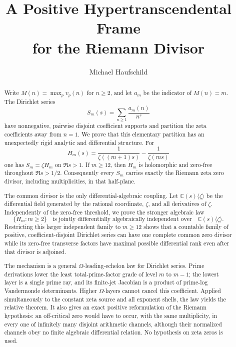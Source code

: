 \documentclass[11pt]{article}
\title{A Positive Hypertranscendental Frame\\
for the Riemann Divisor}
\author{Michael Haufschild}
\date{}
\theoremstyle{definition}
\theoremstyle{remark}
\newcommand{\C}{\mathbb C}
\begin{document}
\maketitle

\begin{abstract}
Write \(M(n)=\max_p v_p(n)\) for \(n\geq2\), and let \(a_m\) be the indicator of
\(M(n)=m\).  The Dirichlet series
\[
 S_m(s)=\sum_{n\geq1}\frac{a_m(n)}{n^s}
\]
have nonnegative, pairwise disjoint coefficient supports and partition the zeta coefficients
away from \(n=1\).  We prove that this elementary partition has an unexpectedly rigid analytic
and differential structure.  For
\[
 H_m(s)=\frac1{\zeta((m+1)s)}-\frac1{\zeta(ms)}
\]
one has \(S_m=\zeta H_m\) on \(\Re s>1\).  If \(m\geq12\), then \(H_m\) is holomorphic and
zero-free throughout \(\Re s>1/2\).  Consequently every \(S_m\) carries exactly the Riemann
zeta zero divisor, including multiplicities, in that half-plane.

The common divisor is the only differential-algebraic coupling.  Let
\(\C(s)\langle\zeta\rangle\) be the differential field generated by the rational coordinate,
\(\zeta\), and all derivatives of \(\zeta\).  Independently of the zero-free threshold, we prove
the stronger algebraic law
\[
 \{H_m:m\geq2\}
\quad\text{is jointly differentially algebraically independent over}\quad
 \C(s)\langle\zeta\rangle .
\]
Restricting this larger independent family to \(m\geq12\) shows that a countable family of
positive, coefficient-disjoint Dirichlet series can have one complete common zero divisor while
its zero-free transverse factors have maximal possible differential rank even after that divisor
is adjoined.

The mechanism is a general \(\Omega\)-leading-echelon law for Dirichlet series.  Prime
derivations lower the least total-prime-factor grade of level \(m\) to \(m-1\); the lowest layer
is a single prime ray, and its finite-jet Jacobian is a product of prime-log Vandermonde
determinants.  Higher \(\Omega\)-layers cannot cancel this coefficient.  Applied simultaneously
to the constant zeta source and all exponent shells, the law yields the relative theorem.
It also gives an exact positive reformulation of the Riemann hypothesis: an off-critical zero
would have to occur, with the same multiplicity, in every one of infinitely many disjoint
arithmetic channels, although their normalized channels obey no finite algebraic differential
relation.  No hypothesis on zeta zeros is used.
\end{abstract}
\end{document}
